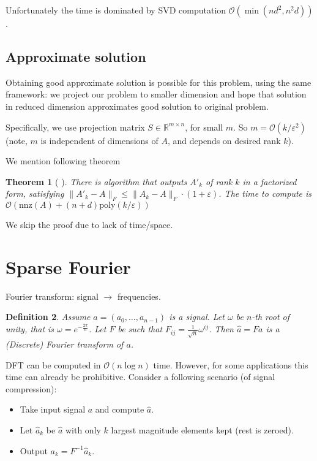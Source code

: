 \documentclass[11pt]{article}
\newtheorem{theorem}{Theorem}
\newtheorem{definition}[theorem]{Definition}
\newcommand{\bigo}{\mathcal{O}}
\begin{document}
Unfortunately the time is dominated by SVD computation $\bigo(\min(nd^2,n^2d))$.

\subsection{Approximate solution}
Obtaining good approximate solution is possible for this problem, using the same framework: we project our problem to smaller dimension and hope that solution in reduced dimension approximates good solution to original problem.

Specifically, we use projection matrix $S \in \mathbb{R}^{m \times n}$, for small $m$. So $m = \bigo(k/\varepsilon^2)$ (note, $m$ is independent of dimensions of $A$, and depends on desired rank $k$). 

We mention following theorem

\begin{theorem}[ \cite{DBLP:conf/stoc/ClarksonW13} ]
There is algorithm that outputs $A'_k$ of rank $k$ in a factorized form, satisfying $\|A'_k - A\|_F \le \|A_k - A\|_F \cdot (1+\varepsilon)$. The time to compute is $\bigo(\textrm{nnz}(A) + (n+d) \textrm{poly}(k/\varepsilon))$
\end{theorem}
We skip the proof due to lack of time/space.

\section{Sparse Fourier}
Fourier transform: signal $\to$ frequencies. 
\begin{definition}
Assume $a = (a_0,\ldots,a_{n-1})$ is a signal. Let $\omega$ be $n$-th root of unity, that is $\omega = e^{-\frac{2 \pi}{n}}$. Let $F$ be such that $F_{ij} = \frac{1}{\sqrt{n}}\omega^{ij}$. Then $\hat{a} = F a$ is a (Discrete) Fourier transform of $a$.
\end{definition}

DFT can be computed in $\bigo(n \log n)$ time. However, for some applications this time can already be prohibitive. Consider a following scenario (of signal compression):
\begin{itemize}
\item Take input signal $a$ and compute $\hat{a}$.
\item Let $\hat{a}_k$ be $\hat{a}$ with only $k$ largest magnitude elements kept (rest is zeroed).
\item Output $a_k = F^{-1} \hat{a}_k$.
\end{itemize}
\end{document}

